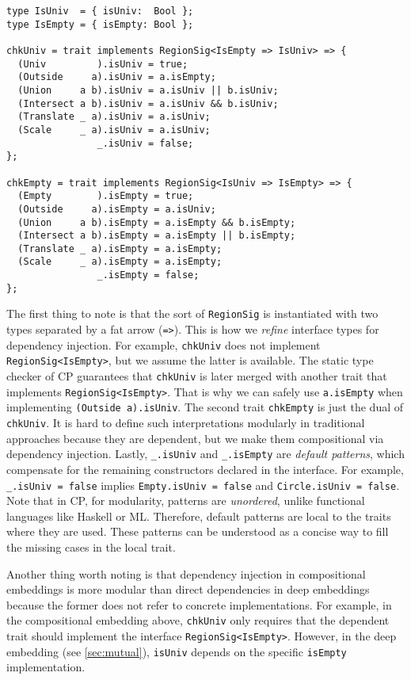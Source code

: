 \begin{lstlisting}
type IsUniv  = { isUniv:  Bool };
type IsEmpty = { isEmpty: Bool };

chkUniv = trait implements RegionSig<IsEmpty => IsUniv> => {
  (Univ         ).isUniv = true;
  (Outside     a).isUniv = a.isEmpty;
  (Union     a b).isUniv = a.isUniv || b.isUniv;
  (Intersect a b).isUniv = a.isUniv && b.isUniv;
  (Translate _ a).isUniv = a.isUniv;
  (Scale     _ a).isUniv = a.isUniv;
                _.isUniv = false;
};

chkEmpty = trait implements RegionSig<IsUniv => IsEmpty> => {
  (Empty        ).isEmpty = true;
  (Outside     a).isEmpty = a.isUniv;
  (Union     a b).isEmpty = a.isEmpty && b.isEmpty;
  (Intersect a b).isEmpty = a.isEmpty || b.isEmpty;
  (Translate _ a).isEmpty = a.isEmpty;
  (Scale     _ a).isEmpty = a.isEmpty;
                _.isEmpty = false;
};
\end{lstlisting}

\noindent
The first thing to note is that the sort of \lstinline{RegionSig} is
instantiated with two types separated by a fat arrow (\lstinline{=>}). This is
how we \emph{refine} interface types for dependency injection. For example,
\lstinline{chkUniv} does not implement \lstinline{RegionSig<IsEmpty>}, but we
assume the latter is available. The static type checker of CP guarantees that
\lstinline{chkUniv} is later merged with another trait that implements
\lstinline{RegionSig<IsEmpty>}. That is why we can safely use
\lstinline{a.isEmpty} when implementing \lstinline{(Outside a).isUniv}. The
second trait \lstinline{chkEmpty} is just the dual of \lstinline{chkUniv}. It is
hard to define such interpretations modularly in traditional approaches because
they are dependent, but we make them compositional via dependency injection.
Lastly, \lstinline{_.isUniv} and \lstinline{_.isEmpty} are \emph{default
patterns}, which compensate for the remaining constructors declared in the
interface. For example, \lstinline{_.isUniv = false} implies
\lstinline{Empty.isUniv = false} and \lstinline{Circle.isUniv = false}. Note
that in CP, for modularity, patterns are \emph{unordered}, unlike functional
languages like Haskell or ML. Therefore, default patterns are local to the
traits where they are used. These patterns can be understood as a concise way to
fill the missing cases in the local trait. 

Another thing worth noting is that dependency injection in compositional
embeddings is more modular than direct dependencies in deep embeddings because
the former does not refer to concrete implementations. For example, in the
compositional embedding above, \lstinline{chkUniv} only requires that the
dependent trait should implement the interface \lstinline{RegionSig<IsEmpty>}.
However, in the deep embedding (see \autoref{sec:mutual}), \lstinline{isUniv}
depends on the specific \lstinline{isEmpty} implementation.

